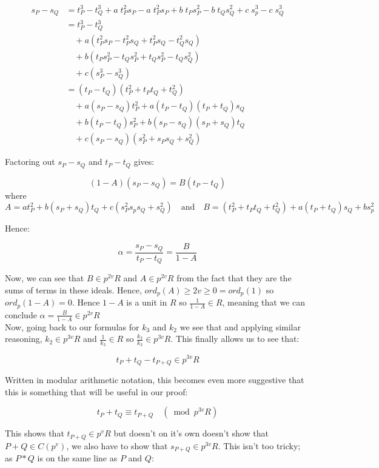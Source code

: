\documentclass{article}
\begin{document}
\begin{align*} 
s_P - s_Q &= t_P^3 - t_Q^3 + a \; t_P^2 s_P - a \; t_P^2 s_P + b \; t_P s_P^2 - b \; t_Q s_Q^2 + c \; s_p^3 - c \; s_Q^3 \\
&= t_P^3 - t_Q^3 \\
& \quad + a(t_P^2 s_P - t_P^2 s_Q + t_P^2 s_Q - t_Q^2 s_Q) \\
& \quad + b(t_P s_P^2 - t_Q s_P^2 + t_Q s_P^2 - t_Q s_Q^2) \\
& \quad + c(s_P^3 - s_Q^3) \\
&= (t_P - t_Q)(t_P^2 + t_P t_Q + t_Q^2) \\
& \quad + a(s_P - s_Q)t_P^2 + a(t_P - t_Q)(t_P + t_Q)s_Q \\
& \quad + b(t_P - t_Q)s_P^2 + b(s_P - s_Q)(s_P + s_Q)t_Q \\
& \quad + c(s_P - s_Q)(s_P^2 + s_P s_Q + s_Q ^2)
\end{align*} 


Factoring out $s_P - s_Q$ and $t_P - t_Q$ gives:

\[(1 - A)(s_P - s_Q) = B(t_P - t_Q)\]
where 
\[A = a t_P^2 + b(s_P + s_Q)t_Q + c(s_P ^2 s_p s_Q + s_Q^2) 
\quad \text{and} \quad
B = (t_P^2 + t_P t_Q + t_Q^2) + a (t_P + t_Q)s_Q + b s_p^2\]

Hence: 

\[ \alpha = \frac{s_P - s_Q}{t_P - t_Q} = \frac{B}{1 - A} \]

Now, we can see that $B \in p^{2v}R$ and $A \in p^{2v} R$ from the fact that they are the sums of terms in these ideals. Hence, $ord_p(A) \geq 2v \geq 0 = ord_p(1)$ so $ord_p(1 - A) = 0$. Hence $1 - A$ is a unit in $R$ so $\frac{1}{1 - A} \in R$, meaning that we can conclude $\alpha = \frac{B}{1 - A} \in p^{2v}R$ \\

Now, going back to our formulas for $k_3$ and $k_2$ we see that and applying similar reasoning, $k_2 \in p^{3v}R$ and $\frac{1}{k_3} \in R$ so $\frac{k_2}{k_3} \in p^{3v}R$. This finally allows us to see that:

\[ t_P + t_Q - t_{P+Q} \in p^{3v}R \]

Written in modular arithmetic notation, this becomes even more suggestive that this is something that will be useful in our proof: 

\[ t_P + t_Q  \equiv t_{P+Q} \quad (\bmod{p^{3v}R}) \]

This shows that $t_{P+Q} \in p^{v}R$ but doesn't on it's own doesn't show that $P + Q \in C(p^v)$, we also have to show that $s_{P + Q} \in p^{3v}R$. This isn't too tricky; as $P*Q$ is on the same line as $P$ and $Q$:\\
\end{document}
